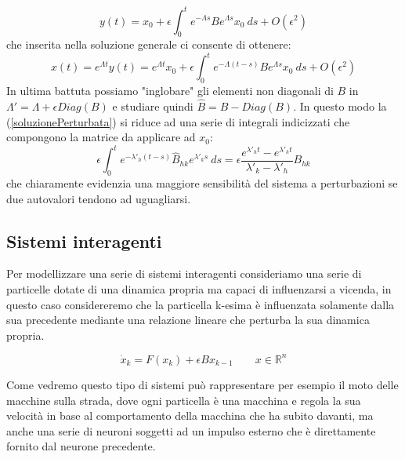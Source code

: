 \begin{equation}
	y(t)= x_0+\epsilon\int_{0}^{t}e^{-\Lambda s} B e^{\Lambda s} x_0\ ds + O(\epsilon^2)
\end{equation}
che inserita nella soluzione generale ci consente di ottenere:
\begin{equation}
	x(t)=e^{\Lambda t}y(t)= e^{\Lambda t}x_0+\epsilon\int_{0}^{t}e^{-\Lambda (t-s)} B e^{\Lambda s} x_0\ ds + O(\epsilon^2)
	\label{soluzionePerturbata}
\end{equation}
In ultima battuta possiamo "inglobare" gli elementi non diagonali di $B$ in $\Lambda'=\Lambda+ \epsilon Diag(B)$ e studiare quindi $\hat{B}=B-Diag(B)$. In questo modo la (\ref{soluzionePerturbata}) si riduce ad una serie di integrali indicizzati che compongono la matrice da applicare ad $x_0$:
\begin{equation*}
	\epsilon\int_{0}^{t}e^{-\lambda'_h (t-s)} \hat{B}_{hk} e^{\lambda'_k s}\ ds=\epsilon\frac{e^{\lambda'_ht}-e^{\lambda'_kt}}{\lambda'_k-\lambda'_h}B_{hk}
\end{equation*}
che chiaramente evidenzia una maggiore sensibilità del sistema a perturbazioni se due autovalori tendono ad uguagliarsi.

\subsection{Sistemi interagenti}
Per modellizzare una serie di sistemi interagenti consideriamo una serie di particelle dotate di una dinamica propria ma capaci di influenzarsi a vicenda, in questo caso considereremo che la particella k-esima è influenzata solamente dalla sua precedente mediante una relazione lineare che perturba la sua dinamica propria.
\begin{center}

    \begin{equation}
    	\dot{x}_k=F(x_k)+\epsilon Bx_{k-1} \qquad x\in\mathbb{R}^n
    	\label{diffeqinteragenti}
   \end{equation}	
\end{center} 
Come vedremo questo tipo di sistemi può rappresentare per esempio il moto delle macchine sulla strada, dove ogni particella è una macchina e regola la sua velocità in base al comportamento della macchina che ha subito davanti, ma anche una serie di neuroni soggetti ad un impulso esterno che è direttamente fornito dal neurone precedente.\\

